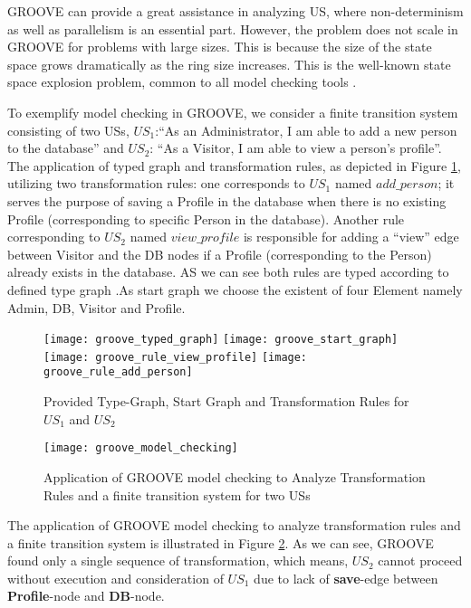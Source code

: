 GROOVE can provide a great assistance in analyzing US, where non-determinism as well as parallelism is an essential part. However, the problem does not scale in GROOVE for problems with large sizes. This is because the size of the state space grows dramatically as the ring size increases. This is the well-known state space explosion problem, common to all model checking tools \cite{rensink2004representing}.
\begin{example}\label{groove_example}
To exemplify model checking in GROOVE, we consider a finite transition system consisting of two USs, $US_1$:\enquote{As an Administrator, I am able to add a new person to the database} and  $US_2$: \enquote{As a Visitor, I am able to view a person’s proﬁle}. The application of typed graph and transformation rules, as depicted in Figure \ref{fig:groove_transformation_rules}, utilizing two transformation rules: one corresponds to $US_1$ named $add\_person$; it serves the purpose of saving a Profile in the database when there is no existing Profile (corresponding to specific Person in the database). Another rule corresponding to $US_2$ named $view\_profile$ is responsible for adding a \enquote{view} edge between Visitor and the DB nodes if a Profile (corresponding to the Person) already exists in the database. AS we can see both rules are typed according to defined type graph .As start graph we choose the existent of four Element namely Admin, DB, Visitor and Profile.
\begin{figure}
\center
\texttt{[image: groove\_typed\_graph]}
\texttt{[image: groove\_start\_graph]}
\texttt{[image: groove\_rule\_view\_profile]}
\texttt{[image: groove\_rule\_add\_person]}
\caption{Provided Type-Graph, Start Graph and Transformation Rules for $US_1$ and $US_2$ } \label{fig:groove_transformation_rules}
\end{figure}
\begin{figure}
\center
\texttt{[image: groove\_model\_checking]}
\caption{Application of GROOVE model checking to Analyze Transformation Rules and a finite transition system for two USs }\label{fig:groove_model_checking}
\end{figure}
\end{example}
The application of GROOVE model checking to analyze transformation rules and a finite transition system is illustrated in Figure \ref{fig:groove_model_checking}. As we can see, GROOVE found only a single sequence of transformation, which means, $US_2$ cannot proceed without execution and consideration of $US_1$ due to lack of \textbf{save}-edge between \textbf{Profile}-node and \textbf{DB}-node. 


